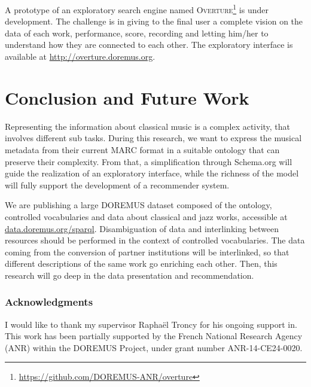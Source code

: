 \documentclass{llncs}
\begin{document}
A prototype of an exploratory search engine named \textsc{Overture}\footnote{\url{https://github.com/DOREMUS-ANR/overture}} is under development. The challenge is in giving to the final user a complete vision on the data of each work, performance, score, recording and letting him/her to understand how they are connected to each other. The exploratory interface is available at \url{http://overture.doremus.org}.


\section{Conclusion and Future Work}
\label{sec:conclusion}
Representing the information about classical music is a complex activity, that involves different sub tasks. During this research, we want to express the musical metadata from their current MARC format in a suitable ontology that can preserve their complexity. From that, a simplification through Schema.org will guide the realization of an exploratory interface, while the richness of the model will fully support the development of a recommender system.

We are publishing a large DOREMUS dataset composed of the ontology, controlled vocabularies and data about classical and jazz works, accessible at \url{data.doremus.org/sparql}. Disambiguation of data and interlinking between resources should be performed in the context of controlled vocabularies. The data coming from the conversion of partner institutions will be interlinked, so that different descriptions of the same work go enriching each other. Then, this research will go deep in the data presentation and recommendation.

\subsubsection*{Acknowledgments}
I would like to thank my supervisor Rapha\"el Troncy for his ongoing support in. This work has been partially supported by the French National Research Agency (ANR) within the DOREMUS Project, under grant number ANR-14-CE24-0020.



\end{document}
